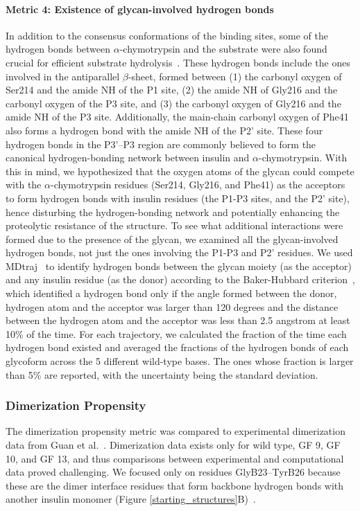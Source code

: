 \documentclass[9pt]{elife}
\begin{document}
\paragraph{Metric 4: Existence of glycan-involved hydrogen bonds}
In addition to the consensus conformations of the binding sites, some of the hydrogen bonds between $\alpha$-chymotrypsin and the substrate were also found crucial for efficient substrate hydrolysis~\cite{hedstrom2002serine}. These hydrogen bonds include the ones involved in the antiparallel $\beta$-sheet, formed between (1) the carbonyl oxygen of Ser214 and the amide NH of the P1 site, (2) the amide NH of Gly216 and the carbonyl oxygen of the P3 site, and (3) the carbonyl oxygen of Gly216 and the amide  NH of the P3 site. Additionally, the main-chain carbonyl oxygen of Phe41 also forms a hydrogen bond with the amide NH of the P2' site. These four hydrogen bonds in the P3'--P3 region are commonly believed to form the canonical hydrogen-bonding network between insulin and $\alpha$-chymotrypsin. With this in mind, we hypothesized that the oxygen atoms of the glycan could compete with the $\alpha$-chymotrypsin residues (Ser214, Gly216, and Phe41) as the acceptors to form hydrogen bonds with insulin residues (the P1-P3 sites, and the P2' site), hence disturbing the hydrogen-bonding network and potentially enhancing the proteolytic resistance of the structure. To see what additional interactions were formed due to the presence of the glycan, we examined all the glycan-involved hydrogen bonds, not just the ones involving the P1-P3 and P2' residues. We used MDtraj~\cite{mcgibbon2015mdtraj} to identify hydrogen bonds between the glycan moiety (as the acceptor) and any insulin residue (as the donor) according to the Baker-Hubbard criterion~\cite{baker1984hydrogen}, which identified a hydrogen bond only if the angle formed between the donor, hydrogen atom and the acceptor was larger than 120 degrees and the distance between the hydrogen atom and the acceptor was less than 2.5 angstrom at least 10\% of the time. For each trajectory, we calculated the fraction of the time each hydrogen bond existed and averaged the fractions of the hydrogen bonds of each glycoform across the 5 different wild-type bases. The ones whose fraction is larger than 5\% are reported, with the uncertainty being the standard deviation.

\subsubsection{Dimerization Propensity}
The dimerization propensity metric was compared to experimental dimerization data from Guan et al.~\cite{guan2018chemically}. Dimerization data exists only for wild type, GF 9, GF 10, and GF 13, and thus comparisons between experimental and computational data proved challenging. We focused only on residues GlyB23--TyrB26 because these are the dimer interface residues that form backbone hydrogen bonds with another insulin monomer (Figure \ref{starting_structures}B)~\cite{timofeev2010x, harding1966crystal, antolikova2011dimerinterface}. 
\end{document}

